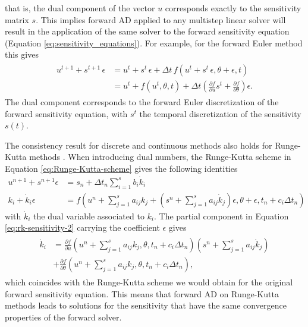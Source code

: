 that is, the dual component of the vector $u$ corresponds exactly to the sensitivity matrix $s$. 
This implies forward AD applied to any multistep linear solver will result in the application of the same solver to the forward sensitivity equation (Equation \eqref{eq:sensitivity_equations}).  
For example, for the forward Euler method this gives 
\begin{align}
\begin{split}
    u^{t+1} + s^{t+1} \, \epsilon 
    &= 
    u^t +  s^t \, \epsilon + \Delta t \, f (u^t + s^t \, \epsilon, \theta + \epsilon, t) \\
    &= 
    u^t + f(u^t, \theta, t) 
    + 
    \Delta t 
    \left( 
    \frac{\partial f}{\partial u} s^t + 
    \frac{\partial f}{\partial \theta}
    \right) \epsilon.
\end{split}
\label{eq:sensitivity-equation-AD}
\end{align}
The dual component corresponds to the forward Euler discretization of the forward sensitivity equation, with $s^t$ the temporal discretization of the sensitivity $s(t)$.

The consistency result for discrete and continuous methods also holds for Runge-Kutta methods \cite{Walther_2007}. 
When introducing dual numbers, the Runge-Kutta scheme in Equation \eqref{eq:Runge-Kutta-scheme} gives the following identities
\begin{align}
    u^{n+1} + s^{n+1} \epsilon 
    &= 
    s_n + \Delta t_n \sum_{i=1}^s b_i \dot k_i
    \\
    k_i + \dot k_i \epsilon
    &= 
    f \left(u^n + \sum_{j=1}^s a_{ij} k_j + \left( s^n + \sum_{j=1}^s a_{ij} \dot k_j \right) \epsilon , \theta + \epsilon ,  t_n + c_i \Delta t_n \right) \label{eq:rk-sensitivity-2}
\end{align}
with $\dot k_i$ the dual variable associated to $k_i$.
The partial component in Equation \eqref{eq:rk-sensitivity-2} carrying the coefficient $\epsilon$ gives 
\begin{align}
\begin{split}
    \dot k_i
    &= 
    \frac{\partial f}{\partial u} 
    \left(u^n + \sum_{j=1}^s a_{ij} k_j, \theta,  t_n + c_i \Delta t_n \right)
    \left( s^n + \sum_{j=1}^s a_{ij} \dot k_j \right) \\
    &+ 
    \frac{\partial f}{\partial \theta} 
    \left(u^n + \sum_{j=1}^s a_{ij} k_j, \theta,  t_n + c_i \Delta t_n \right),
\end{split}
\end{align}
which coincides with the Runge-Kutta scheme we would obtain for the original forward sensitivity equation. 
This means that forward AD on Runge-Kutta methods leads to solutions for the sensitivity that have the same convergence properties of the forward solver. 

